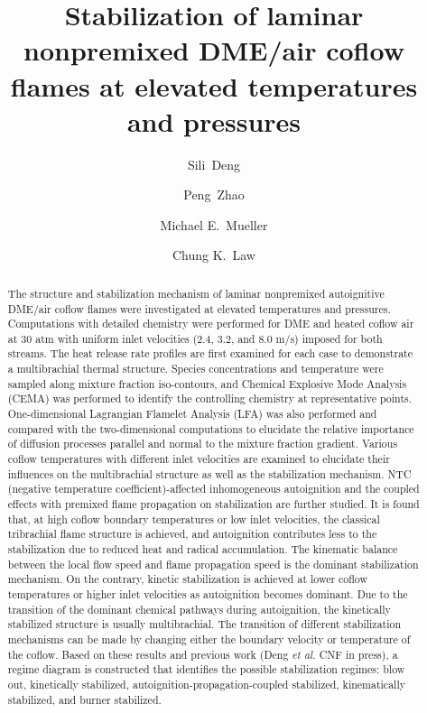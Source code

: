 \documentclass[review,3p,times]{elsarticle}
\begin{document}
\begin{frontmatter}

\title{Stabilization of laminar nonpremixed DME/air coflow flames at elevated temperatures and pressures}

\author{Sili~Deng}
\author{Peng~Zhao}
\author{Michael E.~Mueller}
\author{Chung K.~Law}

\address{Department of Mechanical and Aerospace Engineering, Princeton University, Princeton, NJ 08544, USA}

\begin{abstract}

The structure and stabilization mechanism of laminar nonpremixed autoignitive DME/air coflow flames were investigated at elevated temperatures and pressures. Computations with detailed chemistry were performed for DME and heated coflow air at $30$ atm with uniform inlet velocities ($2.4$, $3.2$, and $8.0$ m/s) imposed for both streams.  The heat release rate profiles are first examined for each case to demonstrate a multibrachial thermal structure.  Species concentrations and temperature were sampled along mixture fraction iso-contours, and Chemical Explosive Mode Analysis (CEMA) was performed to identify the controlling chemistry at representative points.  One-dimensional Lagrangian Flamelet Analysis (LFA) was also performed and compared with the two-dimensional computations to elucidate the relative importance of diffusion processes parallel and normal to the mixture fraction gradient.  Various coflow temperatures with different inlet velocities are examined to elucidate their influences on the multibrachial structure as well as the stabilization mechanism.  NTC (negative temperature coefficient)-affected inhomogeneous autoignition and the coupled effects with premixed flame propagation on stabilization are further studied.  It is found that, at high coflow boundary temperatures or low inlet velocities, the classical tribrachial flame structure is achieved, and autoignition contributes less to the stabilization due to reduced heat and radical accumulation.  The kinematic balance between the local flow speed and flame propagation speed is the dominant stabilization mechanism.  On the contrary, kinetic stabilization is achieved at lower coflow temperatures or higher inlet velocities as autoignition becomes dominant.  Due to the transition of the dominant chemical pathways during autoignition, the kinetically stabilized structure is usually multibrachial.  The transition of different stabilization mechanisms can be made by changing either the boundary velocity or temperature of the coflow.  Based on these results and previous work (Deng \emph{et al.} CNF in press), a regime diagram is constructed that identifies the possible stabilization regimes: blow out, kinetically stabilized, autoignition-propagation-coupled stabilized, kinematically stabilized, and burner stabilized.          


\end{abstract}
\end{frontmatter}
\end{document}
